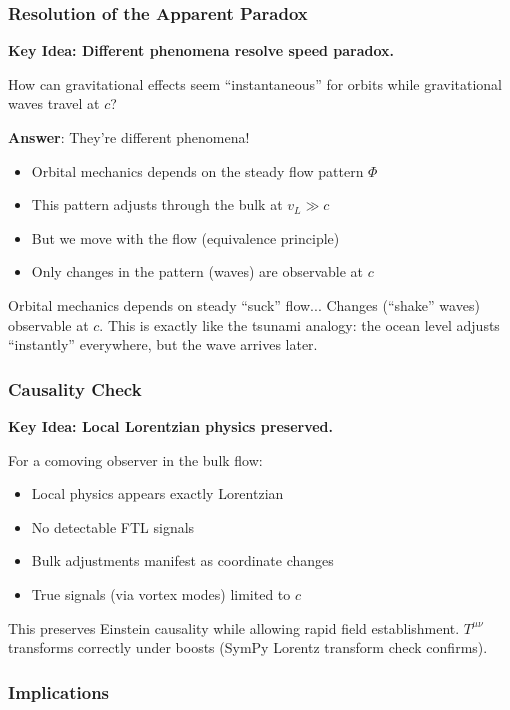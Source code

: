 \subsubsection{Resolution of the Apparent Paradox}

\textbf{Key Idea: Different phenomena resolve speed paradox.}

How can gravitational effects seem ``instantaneous'' for orbits while gravitational waves travel at $c$?

\textbf{Answer}: They're different phenomena!
\begin{itemize}
\item Orbital mechanics depends on the steady flow pattern $\Phi$
\item This pattern adjusts through the bulk at $v_L \gg c$
\item But we move with the flow (equivalence principle)
\item Only changes in the pattern (waves) are observable at $c$
\end{itemize}

Orbital mechanics depends on steady ``suck'' flow... Changes (``shake'' waves) observable at $c$. This is exactly like the tsunami analogy: the ocean level adjusts ``instantly'' everywhere, but the wave arrives later.

\subsubsection{Causality Check}

\textbf{Key Idea: Local Lorentzian physics preserved.}

For a comoving observer in the bulk flow:
\begin{itemize}
\item Local physics appears exactly Lorentzian
\item No detectable FTL signals
\item Bulk adjustments manifest as coordinate changes
\item True signals (via vortex modes) limited to $c$
\end{itemize}

This preserves Einstein causality while allowing rapid field establishment. $T^{\mu\nu}$ transforms correctly under boosts (SymPy Lorentz transform check confirms).

\subsubsection{Implications}


